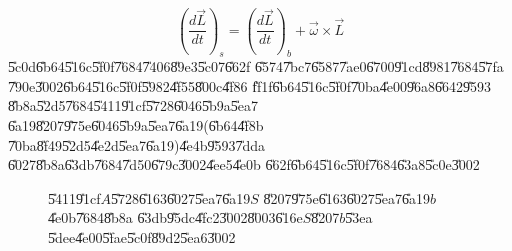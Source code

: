\documentclass[12pt,a4paper]{article}
\begin{document}
\begin{equation}
\left( \frac{d\vec{L}}{dt}\right) _{s}=\left( \frac{d\vec{L}}{dt}\right)
_{b}+\vec{\omega}\times \vec{L}  \label{eq1}
\end{equation}%
\U{5c0d}\U{6b64}\U{516c}\U{5f0f}\U{7684}\U{7406}\U{89e3}\U{5c07}\U{662f}%
\U{6574}\U{7bc7}\U{6587}\U{7ae0}\U{6700}\U{91cd}\U{8981}\U{7684}\U{57fa}%
\U{790e}\U{3002}\U{6b64}\U{516c}\U{5f0f}\U{5982}\U{4f55}\U{800c}\U{4f86}%
\U{ff1f}\U{6b64}\U{516c}\U{5f0f}\U{70ba}\U{4e00}\U{96a8}\U{6642}\U{9593}%
\U{8b8a}\U{52d5}\U{7684}\U{5411}\U{91cf}\U{5728}\U{6046}\U{5b9a}\U{5ea7}%
\U{6a19}\U{8207}\U{975e}\U{6046}\U{5b9a}\U{5ea7}\U{6a19}(\U{6b64}\U{4f8b}%
\U{70ba}\U{8f49}\U{52d5}\U{4e2d}\U{5ea7}\U{6a19})\U{4e4b}\U{9593}\U{7dda}%
\U{6027}\U{8b8a}\U{63db}\U{7684}\U{7d50}\U{679c}\U{3002}\U{4ee5}\U{4e0b}%
\U{662f}\U{6b64}\U{516c}\U{5f0f}\U{7684}\U{63a8}\U{5c0e}\U{3002}

\begin{figure}[th]
\caption{{}\U{5411}\U{91cf}$A$\U{5728}\U{6163}\U{6027}\U{5ea7}\U{6a19}$S$%
\U{8207}\U{975e}\U{6163}\U{6027}\U{5ea7}\U{6a19}$b$\U{4e0b}\U{7684}\U{8b8a}%
\U{63db}\U{95dc}\U{4fc2}\U{3002}\U{8003}\U{616e}$S$\U{8207}$b$\U{53ea}%
\U{5dee}\U{4e00}\U{5fae}\U{5c0f}\U{89d2}\U{5ea6}\U{3002}}
\label{firstfig}
\begin{center}
\fbox{}
\end{center}
\end{figure}
\bigskip
\end{document}
